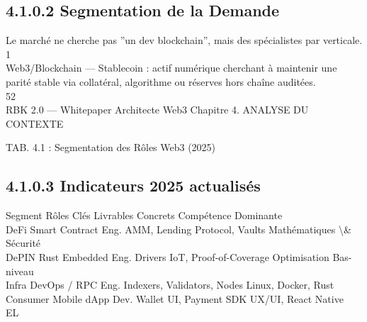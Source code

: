 \subsection{4.1.0.2 Segmentation de la Demande}
Le marché ne cherche pas ”un dev blockchain”, mais des spécialistes par verticale.\\
1\\
Web3/Blockchain — Stablecoin : actif numérique cherchant à maintenir une parité stable via collatéral, algorithme ou réserves hors chaîne auditées.\\
\vspace{0.5em}
\vspace{0.5em}
\vspace{0.5em}
\vspace{0.5em}
52\\
RBK 2.0 — Whitepaper Architecte Web3                                                                                           Chapitre 4. ANALYSE DU CONTEXTE\\
\vspace{0.5em}
\vspace{0.5em}
\begin{center}\begin{tabular}TAB. 4.1 : Segmentation des Rôles Web3 (2025)\end{tabular}\end{center}
\vspace{0.5em}
\vspace{0.5em}
\subsection{4.1.0.3 Indicateurs                                                                      2025                                                            actualisés}
\vspace{0.5em}
\vspace{0.5em}
Segment        Rôles Clés                Livrables Concrets                     Compétence Dominante\\
DeFi           Smart Contract Eng.       AMM, Lending Protocol, Vaults          Mathématiques \textbackslash{}& Sécurité\\
DePIN          Rust Embedded Eng.        Drivers IoT, Proof-of-Coverage         Optimisation Bas-niveau\\
Infra          DevOps / RPC Eng.         Indexers, Validators, Nodes            Linux, Docker, Rust\\
Consumer       Mobile dApp Dev.          Wallet UI, Payment SDK                 UX/UI, React Native\\
\vspace{0.5em}
\vspace{0.5em}
\vspace{0.5em}
\vspace{0.5em}
EL\\
